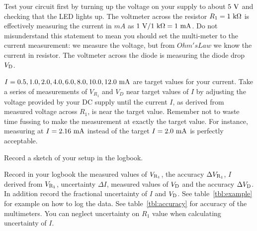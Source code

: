 Test your circuit first by turning up the voltage on your supply to
about $5~\rm V$ and checking that the LED lights up.  The voltmeter
across the resistor $R_1=1~\rm k\Omega$ is effectively measuring the
current in $mA$ as $1~{\rm V}/1~{\rm k\Omega} = 1~\rm mA$.  Do not
misunderstand this statement to mean you should set the multi-meter to
the current measurement: we measure the voltage, but from $Ohm's Law$
we know the current in resistor.  The voltmeter across the diode is
measuring the diode drop $V_{\rm D}$.

$I = 0.5,1.0,2.0,4.0,6.0,8.0,10.0,12.0~\rm mA$ are target values for your current. 
Take a series of measurements of $V_{R_1}$ and $V_D$ near target values of $I$
by adjusting the voltage provided by your DC supply until the current $I$, as derived from measured
voltage across $R_1$, is near the target value.  Remember
not to waste time fussing to make the measurement at exactly the
target value.  For instance, measuring at $I=2.16~\rm mA$ instead of
the target $I=2.0 ~\rm mA$ is perfectly acceptable.  
\begin{measurement} Record a sketch of your setup in the logbook. 
\end{measurement}
\begin{measurement} 
Record in your logbook the measured values of $V_{\rm R_1}$, the accuracy $\Delta V_{\rm R_1}$, $I$ derived from $V_{\rm R_1}$, uncertainty $\Delta I$, measured values of  $V_{\rm D}$ and the accuracy $\Delta V_{\rm D}$. In addition record the fractional uncertainty of $I$ and $V_{\rm D}$. See table~\ref{tbl:example} for example on how to log the data. See table~\ref{tbl:accuracy} for accuracy of the multimeters. You  can neglect uncertainty on $R_1$ value when calculating uncertainty of $I$.
\end{measurement}
 

